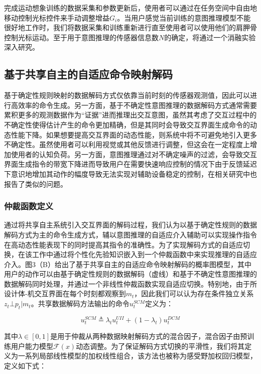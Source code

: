 完成运动想象训练的数据采集和参数更新后，使用者可以通过在任务空间中自由地移动控制光标控件来手动调整增益${G_i}$。当用户感觉当前训练的意图推理模型不能很好地工作时，我们将数据采集和训练重新进行直至使用者可以使用他们的肩胛骨控制光标运动。至于用于意图推理的传感器信息数$N$的确定，将通过一个消融实验深入研究。  

\subsection{基于共享自主的自适应命令映射解码}  基于确定性规则映射的数据解码方式仅依靠当前时刻的传感器观测值，因此可以进行高效率的命令生成。另一方面，基于不确定性意图推理的数据解码方式通常需要累积更多的观测数据作为``证据''进而推理出交互意图，虽然其考虑了交互过程中的不确定性使得估计产生的命令更加精确，但是其同时会导致交互界面生成命令的动态性能下降。如果想要提高交互界面的动态性能，则系统中将不可避免地引入更多不确定性。虽然使用者可以利用视觉或其他反馈进行调整，但这会在一定程度上增加使用者的认知负荷。另一方面，意图推理通过对不确定噪声的过滤，会导致交互界面生成指令的带宽下降进而导致用户在需要快速响应控制的情况下由于反馈延迟下意识地增加其动作的幅度导致无法实现对辅助设备稳定的控制，在相关研究\cite{seanez-gonzalezStaticDynamicDecoding2017}中也报告了类似的问题。

\subsubsection{仲裁函数定义} 
通过将共享自主系统引入交互界面的解码过程，我们认为以基于确定性规则的数据解码方式为主的命令生成方式，辅以意图推理的自适应介入辅助可以实现操作指令在高动态性能表现下的同时提高其指令的准确性。为了实现解码方式的自适应切换，在该工作中通过将个性化先验知识嵌入到一个仲裁函数中来实现推理的自适应介入。图3（B）给出了基于共享自主的自适应命令映射解码的概率图模型，其中用户的动作可以由基于确定性规则的数据解码（虚线）和基于不确定性意图推理的数据解码同时处理，并通过一个非线性仲裁函数实现自适应切换。特别地，由于所设计体-机交互界面在每个时刻都观察到${m_t}$，因此我们可以认为存在条件独立关系${z_t} \bot {p_t}|{m_t}$。共享数据解码方法输出的命令$u_t^{SCM}$定义为：

\begin{equation}
    \label{ex6}
    u_t^{SCM}\triangleq \lambda_t u_t^{UII}+(1-\lambda_t)u_t^{DCM}
\end{equation}   

其中$\lambda  \in [0,1]$是用于仲裁从两种数据映射解码方式的混合因子，混合因子由预训练用户能力模型$\mathcal{F} (x)$动态调整。为了保证解码方式切换的平滑性，我们将其定义为一系列局部线性模型的加权线性组合，该方法也被称为感受野加权回归模型\cite{schaalScalableTechniquesNonparametric2002}，定义如下式：

